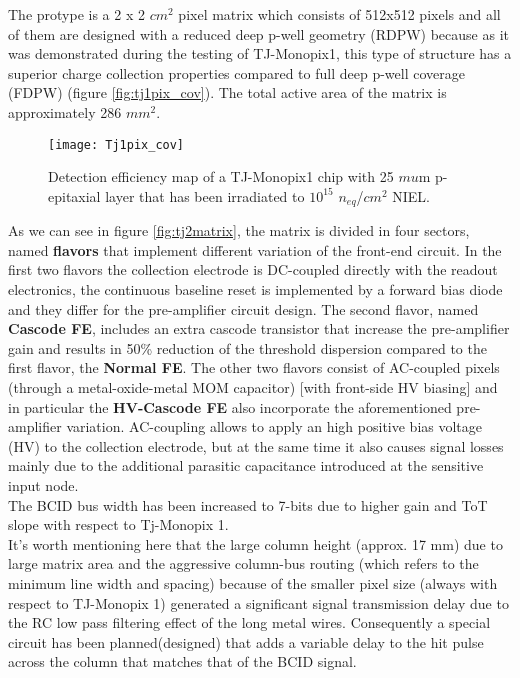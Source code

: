 The protype is a 2 x 2 $cm^{2}$ pixel matrix which consists of 512x512 pixels and all of them are designed with a reduced deep p-well geometry (RDPW) because as it was demonstrated during the testing of TJ-Monopix1, this type of structure has a superior charge collection properties compared to full deep p-well coverage (FDPW) (figure \vref{fig:tj1pix_cov}). The total active area of the matrix is approximately 286 $mm^{2}$. 

\begin{figure}[h!]
\centering
\texttt{[image: Tj1pix\_cov]}
\caption{Detection efficiency map of a TJ-Monopix1 chip with 25 $mu$m p-epitaxial layer that has been irradiated to $10^{15}$ $n_{\textit{eq}}$/$cm^{2}$ NIEL.}
\label{fig:tj1pix_cov}
\end{figure}

As we can see in figure \vref{fig:tj2matrix}, the matrix is divided in four sectors, named \textbf{flavors} that implement different variation of the front-end circuit. In the first two flavors the collection electrode is DC-coupled directly with the readout electronics,  the continuous baseline reset is implemented by a forward bias diode and they differ for the pre-amplifier circuit design. The second flavor, named \textbf{Cascode FE}, includes an extra cascode transistor that increase the pre-amplifier gain and results in 50\% reduction of the threshold dispersion compared to the first flavor, the \textbf{Normal FE}. The other two flavors consist of AC-coupled pixels (through a metal-oxide-metal MOM capacitor) [with front-side HV biasing] and in particular the \textbf{HV-Cascode FE} also incorporate the aforementioned pre-amplifier variation. AC-coupling allows to apply an high positive bias voltage (HV) to the collection electrode, but at the same time it also causes signal losses mainly due to the additional parasitic capacitance introduced at the sensitive input node.\\
The BCID bus width has been increased  to 7-bits due to higher gain and ToT slope with respect to Tj-Monopix 1. \\
It's worth mentioning here that the large column height (approx. 17 mm) due to large matrix area and the aggressive column-bus routing (which refers to the minimum line width and spacing) because of the smaller pixel size (always with respect to TJ-Monopix 1) generated a significant signal transmission delay due to the RC low pass filtering effect of the long metal wires. Consequently a special circuit has been planned(designed) that adds a variable delay to the hit pulse across the column that matches that of the BCID signal.



